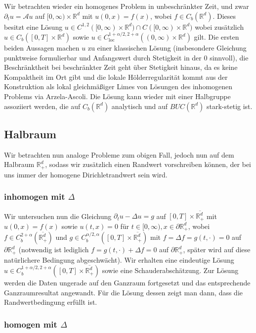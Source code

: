 \documentclass[11pt,a4paper]{scrartcl}
\newcommand{\R}{\mathbb{R}} %
\newcommand{\A}{\mathcal{A}}
\theoremstyle{plain}
\theoremstyle{definition}
\theoremstyle{remark}
\begin{document}
Wir betrachten wieder ein homogenes Problem in unbeschränkter Zeit, und zwar $\partial_t u = \A u$ auf $[0,\infty)\times \R^d$ mit $u(0,x)=f(x)$, wobei $f\in C_b(\R^d)$. Dieses besitzt eine Lösung $u\in C^{1,2}([0,\infty)\times \R^d) \cap C([0,\infty)\times \R^d)$ wobei zusätzlich $u\in C_b([0,T]\times \R^d)$ sowie $u\in C_\mathrm{loc}^{1+\alpha/2,2+\alpha}((0,\infty)\times \R^d)$ gilt. Die ersten beiden Aussagen machen $u$ zu einer klassischen Lösung (insbesondere Gleichung punktweise formulierbar und Anfangswert durch Stetigkeit in der $0$ sinnvoll), die Beschränktheit bei beschränkter Zeit geht über Stetigkeit hinaus, da es keine Kompaktheit im Ort gibt und die lokale Hölderregularität kommt aus der Konstruktion als lokal gleichmäßiger Limes von Lösungen des inhomogenen Problems via Arzela-Ascoli. Die Lösung kann wieder mit einer Halbgruppe assoziiert werden, die auf $C_b(\R^d)$ analytisch und auf $BUC(\R^d)$ stark-stetig ist.

\subsection{Halbraum}

Wir betrachten nun analoge Probleme zum obigen Fall, jedoch nun auf dem Halbraum $\R^d_+$, sodass wir zusätzlich einen Randwert vorschreiben können, der bei uns immer der homogene Dirichletrandwert sein wird.

\subsubsection{inhomogen mit $\Delta$}

Wir untersuchen nun die Gleichung $\partial_t u - \Delta u = g$ auf $[0,T] \times \overline{\R^d_+}$ mit $u(0,x)=f(x)$ sowie $u(t,x)=0$ für $t\in [0,\infty), x\in \partial \R^d_+$, wobei $f\in C_b^{2+\alpha}(\overline{\R^d_+})$ und $g\in C_b^{\alpha/2, \alpha}([0,T] \times \overline{\R^d_+})$ mit $f=\Delta f = g(t,\cdot)=0$ auf $\partial \R^d_+$ (notwendig ist lediglich $f=g(t,\cdot)+\Delta f=0$ auf $\partial \R^d_+$, später wird auf diese natürlichere Bedingung abgeschwächt). Wir erhalten eine eindeutige Lösung $u\in C_b^{1+\alpha/2, 2+\alpha}([0,T]\times \overline{\R^d_+})$ sowie eine Schauderabschätzung. Zur Lösung werden die Daten ungerade auf den Ganzraum fortgesetzt und das entsprechende Ganzraumresultat angewandt. Für die Lösung dessen zeigt man dann, dass die Randwertbedingung erfüllt ist. 

\subsubsection{homogen mit $\Delta$}
\end{document}
